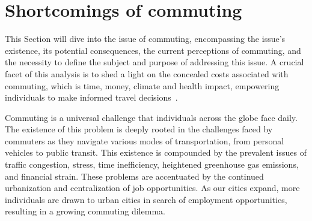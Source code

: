 \section{Shortcomings of commuting}\label{sec:shortcomings-of-commuting}

This Section will dive into the issue of commuting, encompassing the issue's existence, its potential consequences,
the current perceptions of commuting, and the necessity to define the subject and purpose of addressing this issue.
A crucial facet of this analysis is to shed a light on the concealed costs associated with commuting, which is time,
money, climate and health impact, empowering individuals to make informed travel decisions~\cite{alma9921355859805762}.

Commuting is a universal challenge that individuals across the globe face daily.
The existence of this problem is deeply rooted in the challenges faced by commuters as they navigate various modes of
transportation, from personal vehicles to public transit.
This existence is compounded by the prevalent issues of traffic congestion, stress, time inefficiency, heightened
greenhouse gas emissions, and financial strain.
These problems are accentuated by the continued urbanization and centralization of job opportunities.
As our cities expand, more individuals are drawn to urban cities in search of employment opportunities, resulting in a
growing commuting dilemma.

